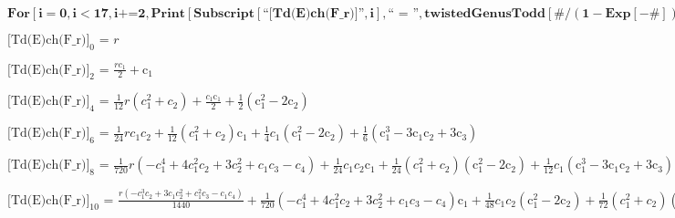 \documentclass{article}
\newcommand{\unicode}[1]{{}}
\begin{document}
\begin{doublespace}
\noindent\(\pmb{\text{For}[i=0,i<17,i\text{+=}2, \text{Print}[\text{Subscript}[\text{{``}[Td(E)ch(F$\_$r)]{''}},i],\text{{``} = {''}},\text{twistedGenusTodd}[\#/(1-\text{Exp}[-\#])\&,i]]]}\)
\end{doublespace}

\noindent\(\text{[Td(E)ch(F$\_$r)]}_0\text{ = }r\)

\noindent\(\text{[Td(E)ch(F$\_$r)]}_2\text{ = }\frac{r c_1}{2}+\text{c$\unicode{02bc}$}_1\)

\noindent\(\text{[Td(E)ch(F$\_$r)]}_4\text{ = }\frac{1}{12} r \left(c_1^2+c_2\right)+\frac{c_1 \text{c$\unicode{02bc}$}_1}{2}+\frac{1}{2} \left(\text{c$\unicode{02bc}$}_1^2-2
\text{c$\unicode{02bc}$}_2\right)\)

\noindent\(\text{[Td(E)ch(F$\_$r)]}_6\text{ = }\frac{1}{24} r c_1 c_2+\frac{1}{12} \left(c_1^2+c_2\right) \text{c$\unicode{02bc}$}_1+\frac{1}{4}
c_1 \left(\text{c$\unicode{02bc}$}_1^2-2 \text{c$\unicode{02bc}$}_2\right)+\frac{1}{6} \left(\text{c$\unicode{02bc}$}_1^3-3 \text{c$\unicode{02bc}$}_1
\text{c$\unicode{02bc}$}_2+3 \text{c$\unicode{02bc}$}_3\right)\)

\noindent\(\text{[Td(E)ch(F$\_$r)]}_8\text{ = }\frac{1}{720} r \left(-c_1^4+4 c_1^2 c_2+3 c_2^2+c_1 c_3-c_4\right)+\frac{1}{24} c_1 c_2 \text{c$\unicode{02bc}$}_1+\frac{1}{24}
\left(c_1^2+c_2\right) \left(\text{c$\unicode{02bc}$}_1^2-2 \text{c$\unicode{02bc}$}_2\right)+\frac{1}{12} c_1 \left(\text{c$\unicode{02bc}$}_1^3-3
\text{c$\unicode{02bc}$}_1 \text{c$\unicode{02bc}$}_2+3 \text{c$\unicode{02bc}$}_3\right)+\frac{1}{24} \left(\text{c$\unicode{02bc}$}_1^4-4 \text{c$\unicode{02bc}$}_1^2
\text{c$\unicode{02bc}$}_2+2 \text{c$\unicode{02bc}$}_2^2+4 \text{c$\unicode{02bc}$}_1 \text{c$\unicode{02bc}$}_3-4 \text{c$\unicode{02bc}$}_4\right)\)

\noindent\(\text{[Td(E)ch(F$\_$r)]}_{10}\text{ = }\frac{r \left(-c_1^3 c_2+3 c_1 c_2^2+c_1^2 c_3-c_1 c_4\right)}{1440}+\frac{1}{720} \left(-c_1^4+4
c_1^2 c_2+3 c_2^2+c_1 c_3-c_4\right) \text{c$\unicode{02bc}$}_1+\frac{1}{48} c_1 c_2 \left(\text{c$\unicode{02bc}$}_1^2-2 \text{c$\unicode{02bc}$}_2\right)+\frac{1}{72}
\left(c_1^2+c_2\right) \left(\text{c$\unicode{02bc}$}_1^3-3 \text{c$\unicode{02bc}$}_1 \text{c$\unicode{02bc}$}_2+3 \text{c$\unicode{02bc}$}_3\right)+\frac{1}{48}
c_1 \left(\text{c$\unicode{02bc}$}_1^4-4 \text{c$\unicode{02bc}$}_1^2 \text{c$\unicode{02bc}$}_2+2 \text{c$\unicode{02bc}$}_2^2+4 \text{c$\unicode{02bc}$}_1
\text{c$\unicode{02bc}$}_3-4 \text{c$\unicode{02bc}$}_4\right)+\frac{1}{120} \left(\text{c$\unicode{02bc}$}_1^5-5 \text{c$\unicode{02bc}$}_1^3 \text{c$\unicode{02bc}$}_2+5
\text{c$\unicode{02bc}$}_1 \text{c$\unicode{02bc}$}_2^2+5 \text{c$\unicode{02bc}$}_1^2 \text{c$\unicode{02bc}$}_3-5 \text{c$\unicode{02bc}$}_2 \text{c$\unicode{02bc}$}_3-5
\text{c$\unicode{02bc}$}_1 \text{c$\unicode{02bc}$}_4+5 \text{c$\unicode{02bc}$}_5\right)\)
\end{document}
